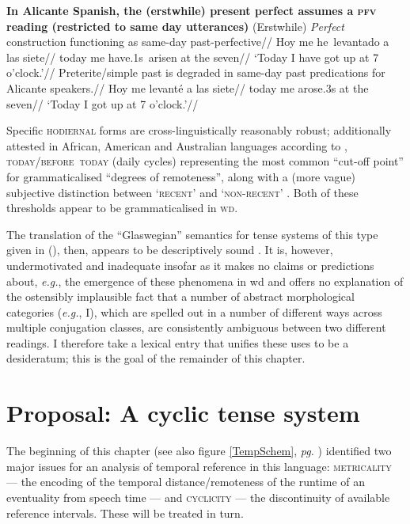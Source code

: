 \pex\textbf{In Alicante Spanish, the (erstwhile) present perfect assumes a \textsc{pfv} reading (restricted to same day utterances)}
\a\begingl\glpreamble \textmd{(Erstwhile) \textit{Perfect} construction functioning as same-day past-perfective}//
\gla Hoy me he~levantado a las siete//
\glb today me have.1s~arisen at the seven//
\glft`Today I have got up at 7 o'clock.'//\endgl
\a\begingl\glpreamble Preterite/simple past is degraded in same-day past predications for Alicante speakers.//
\gla\ljudge{$ ^{*\%} $}Hoy me levanté a las siete//
\glb today me arose.3s at the seven//
\glft`Today I got up at 7 o'clock.'//\endgl\xe



Specific \textsc{hodiernal} forms are cross-linguistically reasonably robust; additionally attested in African, American and Australian languages according to \citet[87]{Comrie1985}, \textsc{today/before~today} (daily cycles) representing the most common ``cut-off point'' for grammaticalised ``degrees of remoteness'', along with a (more vague) subjective distinction between `\textsc{recent}' and \textsc{`non-recent'} \citep[see also][]{Botne2012}. Both of these thresholds appear to be grammaticalised in \textsc{wd}.

The translation of the ``Glaswegian'' semantics for tense systems of this type given in (), then, appears to be descriptively sound \citep[\textit{i.e.}, the analysis in][]{Glasgow1964}. It is, however, undermotivated and inadequate insofar as it makes no claims or predictions about, \textit{e.g.}, the emergence of these phenomena in \gls{wd} and offers no explanation of the ostensibly implausible fact that a number of abstract morphological categories (\textit{e.g.}, \gls{I}), which are spelled out in a number of different ways across multiple conjugation classes, are consistently ambiguous between two different readings. I therefore take a lexical entry that unifies these uses to be a desideratum; this is the goal of the remainder of this chapter.

\section{Proposal: A cyclic tense system}\label{sec:cyc}

The beginning of this chapter (see also figure \ref{TempSchem}, \textit{pg.} \pageref{TempSchem}) identified two major issues for an analysis of temporal reference in this language: \textsc{metricality} --- the encoding of the temporal distance/remoteness of the runtime of an eventuality from speech time  --- and \textsc{cyclicity} --- the discontinuity of available reference intervals. These will be treated in turn.


